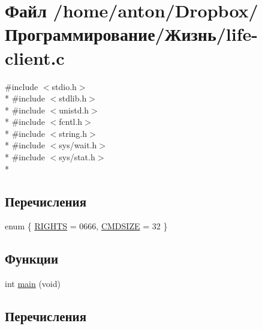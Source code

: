 \hypertarget{life-client_8c}{}\section{Файл /home/anton/\+Dropbox/Программирование/Жизнь/life-\/client.c}
\label{life-client_8c}
{\ttfamily \#include $<$stdio.\+h$>$}\\*
{\ttfamily \#include $<$stdlib.\+h$>$}\\*
{\ttfamily \#include $<$unistd.\+h$>$}\\*
{\ttfamily \#include $<$fcntl.\+h$>$}\\*
{\ttfamily \#include $<$string.\+h$>$}\\*
{\ttfamily \#include $<$sys/wait.\+h$>$}\\*
{\ttfamily \#include $<$sys/stat.\+h$>$}\\*
\subsection*{Перечисления}
\begin{DoxyCompactItemize}
\item 
enum \{ \hyperlink{life-client_8c_a06fc87d81c62e9abb8790b6e5713c55bafa588afcf6a1d45e5503f8fb1f189df2}{R\+I\+G\+H\+TS} = 0666, 
\hyperlink{life-client_8c_a06fc87d81c62e9abb8790b6e5713c55ba82d13d61b41ebfaa72523ab683e418bc}{C\+M\+D\+S\+I\+ZE} = 32
 \}
\end{DoxyCompactItemize}
\subsection*{Функции}
\begin{DoxyCompactItemize}
\item 
int \hyperlink{life-client_8c_a840291bc02cba5474a4cb46a9b9566fe}{main} (void)
\end{DoxyCompactItemize}


\subsection{Перечисления}
